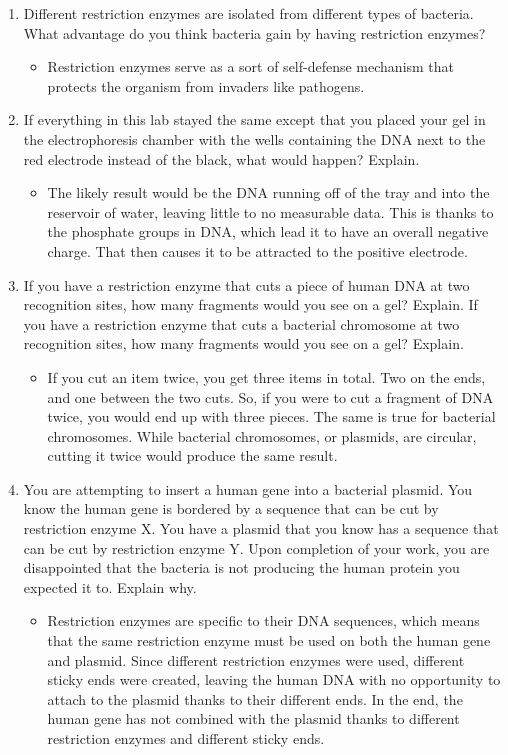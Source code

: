 \documentclass[12pt]{article}
\begin{document}
\begin{enumerate}
    \item Different restriction enzymes are isolated from different types of bacteria.  What advantage do you think bacteria gain by having restriction enzymes?
    \begin{itemize}
        \item Restriction enzymes serve as a sort of self-defense mechanism that protects the organism from invaders like pathogens.
    \end{itemize}
    \item If everything in this lab stayed the same except that you placed your gel in the electrophoresis chamber with the wells containing the DNA next to the red electrode instead of the black, what would happen?  Explain.
    \begin{itemize}
        \item The likely result would be the DNA running off of the tray and into the reservoir of water, leaving little to no measurable data.
        This is thanks to the phosphate groups in DNA, which lead it to have an overall negative charge. That then causes it to be attracted to the positive electrode.
    \end{itemize}
    \item If you have a restriction enzyme that cuts a piece of human DNA at two recognition sites, how many fragments would you see on a gel?
    Explain. If you have a restriction enzyme that cuts a bacterial chromosome at two recognition sites, how many fragments would you see on a gel? Explain.
    \begin{itemize}
        \item If you cut an item twice, you get three items in total. Two on the ends, and one between the two cuts.
        So, if you were to cut a fragment of DNA twice, you would end up with three pieces. The same is true for bacterial chromosomes.
        While bacterial chromosomes, or plasmids, are circular, cutting it twice would produce the same result.
    \end{itemize}
    \item You are attempting to insert a human gene into a bacterial plasmid.
    You know the human gene is bordered by a sequence that can be cut by restriction enzyme X.
    You have a plasmid that you know has a sequence that can be cut by restriction enzyme Y.
    Upon completion of your work, you are disappointed that the bacteria is not producing the human protein you expected it to. Explain why.
    \begin{itemize}
        \item Restriction enzymes are specific to their DNA sequences, which means that the same restriction enzyme must be used on both the human gene and plasmid.
        Since different restriction enzymes were used, different sticky ends were created, leaving the human DNA with no opportunity to attach to the plasmid thanks to their different ends.
        In the end, the human gene has not combined with the plasmid thanks to different restriction enzymes and different sticky ends.
    \end{itemize}
\end{enumerate}
\end{document}
